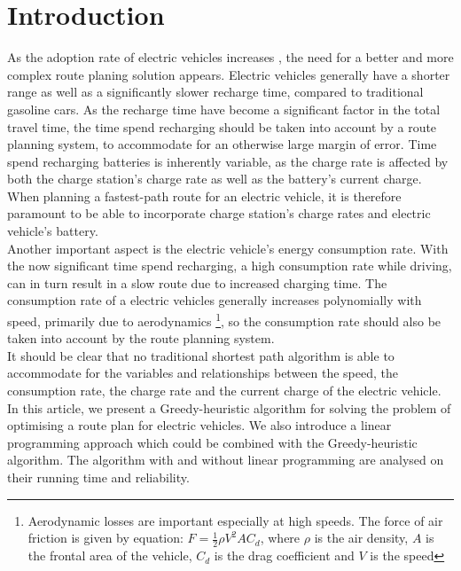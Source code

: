 \section{Introduction}

As the adoption rate of electric vehicles increases \cite{Henry2013}, the need for a better and more complex route planing solution appears. Electric vehicles generally have a shorter range as well as a significantly slower recharge time, compared to traditional gasoline cars. As the recharge time have become a significant factor in the total travel time, the time spend recharging should be taken into account by a route planning system, to accommodate for an otherwise large margin of error. Time spend recharging batteries is inherently variable, as the charge rate is affected by both the charge station's charge rate as well as the battery's current charge. When planning a fastest-path route for an electric vehicle, it is therefore paramount to be able to incorporate charge station's charge rates and electric vehicle's battery.\\

Another important aspect is the electric vehicle's energy consumption rate. With the now significant time spend recharging, a high consumption rate while driving, can in turn result in a slow route due to increased charging time. The consumption rate of a electric vehicles generally increases polynomially with speed, primarily due to aerodynamics \footnote{Aerodynamic losses are important especially at high speeds. The force of air friction is given by equation: $F = \frac{1}{2} \rho V^2 A C_d$, where $\rho$ is the air density, $A$ is the frontal area of the vehicle, $C_d$ is the drag coefficient and $V$ is the speed}, so the consumption rate should also be taken into account by the route planning system.\\

It should be clear that no traditional shortest path algorithm is able to accommodate for the variables and relationships between the speed, the consumption rate, the charge rate and the current charge of the electric vehicle. In this article, we present a Greedy-heuristic algorithm for solving the problem of optimising a route plan for electric vehicles. We also introduce a linear programming approach which could be combined with the Greedy-heuristic algorithm. The algorithm with and without linear programming are analysed on their running time and reliability.




